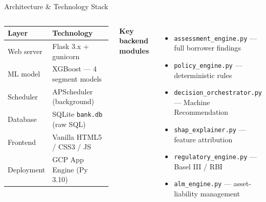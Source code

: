 \documentclass[9pt,aspectratio=169]{beamer}
\begin{document}
\begin{frame}{Architecture \& Technology Stack}
\vspace{-2pt}
\begin{columns}[T]
    \footnotesize
    \begin{tabular}{ll}
      \toprule
      \textbf{Layer} & \textbf{Technology}\\
      \midrule
      Web server  & Flask 3.x + gunicorn\\
      ML model    & XGBoost --- 4 segment models\\
      Scheduler   & APScheduler (background)\\
      Database    & SQLite \texttt{bank.db} (raw SQL)\\
      Frontend    & Vanilla HTML5 / CSS3 / JS\\
      Deployment  & GCP App Engine (Py 3.10)\\
      \bottomrule
    \end{tabular}
    \vspace{6pt}

    \textbf{Key backend modules}
    \begin{itemize}\setlength\itemsep{1pt}
      \footnotesize
      \item[\small$\bullet$] \texttt{assessment\_engine.py} --- full borrower findings
      \item[\small$\bullet$] \texttt{policy\_engine.py} --- deterministic rules
      \item[\small$\bullet$] \texttt{decision\_orchestrator.py} --- Machine Recommendation
      \item[\small$\bullet$] \texttt{shap\_explainer.py} --- feature attribution
      \item[\small$\bullet$] \texttt{regulatory\_engine.py} --- Basel III / RBI
      \item[\small$\bullet$] \texttt{alm\_engine.py} --- asset-liability management
    \end{itemize}


\end{columns}
\end{frame}
\end{document}
